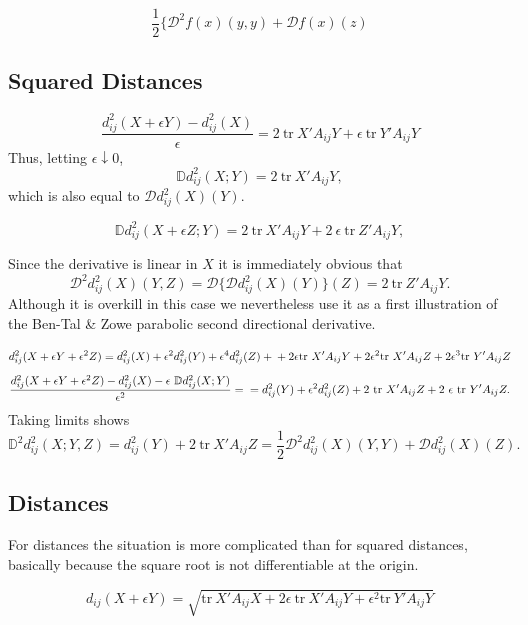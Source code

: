 \documentclass[
  12pt,
]{book}
\theoremstyle{definition}
\theoremstyle{definition}
\theoremstyle{definition}
\theoremstyle{definition}
\theoremstyle{remark}
\begin{document}
\begin{equation}
\frac12 \{\mathcal{D}^2 f(x)(y,y)+\mathcal{D}f(x)(z)
\label{eq:apbtzsmooth}
\end{equation}

\hypertarget{squared-distances}{%
\subsection{Squared Distances}\label{squared-distances}}

\[
\frac{d_{ij}^2(X+\epsilon Y)-d_{ij}^2(X)}{\epsilon}=2\ \text{tr}\ X'A_{ij}Y+\epsilon\ \text{tr}\ Y'A_{ij}Y
\]
Thus, letting \(\epsilon\downarrow 0\),
\[
\mathbb{D}d_{ij}^2(X;Y)=2\ \text{tr}\ X'A_{ij}Y,
\]
which is also equal to \(\mathcal{D}d_{ij}^2(X)(Y)\).

\[
\mathbb{D}d_{ij}^2(X+\epsilon Z;Y)=2\ \text{tr}\ X'A_{ij}Y+2\ \epsilon\ \text{tr}\ Z'A_{ij}Y,
\]

Since the derivative is linear in \(X\) it is immediately obvious that
\[
\mathcal{D}^2d_{ij}^2(X)(Y,Z)=\mathcal{D}\{\mathcal{D}d_{ij}^2(X)(Y)\}(Z)=2\ \text{tr}\ Z'A_{ij}Y.
\]
Although it is overkill in this case we nevertheless use it as a first illustration of the Ben-Tal \& Zowe parabolic second directional derivative.

\[
d_{ij}^2(X+\epsilon Y+\epsilon^2 Z)=\\
d_{ij}^2(X)+\epsilon^2d_{ij}^2(Y)+\epsilon^4d_{ij}^2(Z)+\\
+2\epsilon\text{tr}\ X'A_{ij}Y+2\epsilon^2\text{tr}\ X'A_{ij}Z
+2\epsilon^3\text{tr}\ Y'A_{ij}Z
\]
\[
\frac{d_{ij}^2(X+\epsilon Y+\epsilon^2 Z)-d_{ij}^2(X)-\epsilon\ \mathbb{D}d_{ij}^2(X;Y)}{\epsilon^2}=\\=d_{ij}^2(Y)+\epsilon^2d_{ij}^2(Z)+
2\ \text{tr}\ X'A_{ij}Z+2\ \epsilon\ \text{tr}\ Y'A_{ij}Z.
\]
Taking limits shows
\[
\mathbb{D}^2d_{ij}^2(X;Y,Z)=d_{ij}^2(Y)+2\ \text{tr}\ X'A_{ij}Z=
\frac12\mathcal{D}^2d_{ij}^2(X)(Y,Y)+\mathcal{D}d_{ij}^2(X)(Z).
\]

\hypertarget{distances}{%
\subsection{Distances}\label{distances}}

For distances the situation is more complicated than for squared distances, basically because the square root is not differentiable at the origin.

\[
d_{ij}(X+\epsilon Y)=\sqrt{\text{tr}\ X'A_{ij}X+2\epsilon\ \text{tr}\ X'A_{ij}Y+\epsilon^2\text{tr}\ Y'A_{ij}Y}
\]
\end{document}
